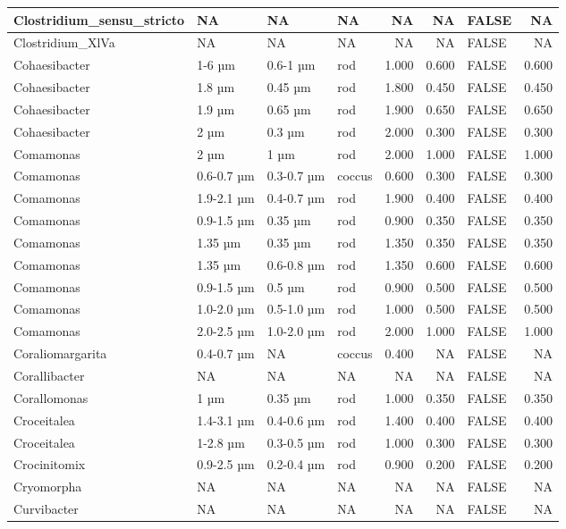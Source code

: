 \documentclass[
]{article}
\begin{document}
\begin{table}
\begin{tabular}{l|l|l|l|r|r|l|r}
Clostridium\_sensu\_stricto & NA & NA & NA & NA & NA & FALSE & NA\\
\hline
Clostridium\_XlVa & NA & NA & NA & NA & NA & FALSE & NA\\
\hline
Cohaesibacter & 1-6 µm & 0.6-1 µm & rod & 1.000 & 0.600 & FALSE & 0.600\\
\hline
Cohaesibacter & 1.8 µm & 0.45 µm & rod & 1.800 & 0.450 & FALSE & 0.450\\
\hline
Cohaesibacter & 1.9 µm & 0.65 µm & rod & 1.900 & 0.650 & FALSE & 0.650\\
\hline
Cohaesibacter & 2 µm & 0.3 µm & rod & 2.000 & 0.300 & FALSE & 0.300\\
\hline
Comamonas & 2 µm & 1 µm & rod & 2.000 & 1.000 & FALSE & 1.000\\
\hline
Comamonas & 0.6-0.7 µm & 0.3-0.7 µm & coccus & 0.600 & 0.300 & FALSE & 0.300\\
\hline
Comamonas & 1.9-2.1 µm & 0.4-0.7 µm & rod & 1.900 & 0.400 & FALSE & 0.400\\
\hline
Comamonas & 0.9-1.5 µm & 0.35 µm & rod & 0.900 & 0.350 & FALSE & 0.350\\
\hline
Comamonas & 1.35 µm & 0.35 µm & rod & 1.350 & 0.350 & FALSE & 0.350\\
\hline
Comamonas & 1.35 µm & 0.6-0.8 µm & rod & 1.350 & 0.600 & FALSE & 0.600\\
\hline
Comamonas & 0.9-1.5 µm & 0.5 µm & rod & 0.900 & 0.500 & FALSE & 0.500\\
\hline
Comamonas & 1.0-2.0 µm & 0.5-1.0 µm & rod & 1.000 & 0.500 & FALSE & 0.500\\
\hline
Comamonas & 2.0-2.5 µm & 1.0-2.0 µm & rod & 2.000 & 1.000 & FALSE & 1.000\\
\hline
Coraliomargarita & 0.4-0.7 µm & NA & coccus & 0.400 & NA & FALSE & NA\\
\hline
Corallibacter & NA & NA & NA & NA & NA & FALSE & NA\\
\hline
Corallomonas & 1 µm & 0.35 µm & rod & 1.000 & 0.350 & FALSE & 0.350\\
\hline
Croceitalea & 1.4-3.1 µm & 0.4-0.6 µm & rod & 1.400 & 0.400 & FALSE & 0.400\\
\hline
Croceitalea & 1-2.8 µm & 0.3-0.5 µm & rod & 1.000 & 0.300 & FALSE & 0.300\\
\hline
Crocinitomix & 0.9-2.5 µm & 0.2-0.4 µm & rod & 0.900 & 0.200 & FALSE & 0.200\\
\hline
Cryomorpha & NA & NA & NA & NA & NA & FALSE & NA\\
\hline
Curvibacter & NA & NA & NA & NA & NA & FALSE & NA\\

\end{tabular}
\end{table}
\end{document}
